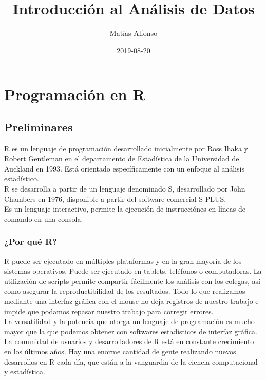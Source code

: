 \documentclass[spanish,]{book}
\title{Introducción al Análisis de Datos}
\author{Matías Alfonso}
\date{2019-08-20}
\begin{document}
\maketitle

{
\setcounter{tocdepth}{1}
\tableofcontents
}
\part{Programación en R}\label{part-programacion-en-r}

\chapter{Preliminares}\label{prelim}

R es un lenguaje de programación desarrollado inicialmente por Ross
Ihaka y Robert Gentleman en el departamento de Estadística de la
Universidad de Auckland en 1993. Está orientado específicamente con un
enfoque al análisis estadístico.\\
R se desarrolla a partir de un lenguaje denominado S, desarrollado por
John Chambers en 1976, disponible a partir del software comercial
S-PLUS.\\
Es un lenguaje interactivo, permite la ejecución de instrucciónes en
líneas de comando en una consola.

\section{¿Por qué R?}\label{por-que-r}

R puede ser ejecutado en múltiples plataformas y en la gran mayoría de
los sistemas operativos. Puede ser ejecutado en tablets, teléfonos o
computadoras. La utilización de scripts permite compartir fácilmente los
análisis con los colegas, así como asegurar la reproductibilidad de los
resultados. Todo lo que realizamos mediante una interfaz gráfica con el
mouse no deja registros de nuestro trabajo e impide que podamos repasar
nuestro trabajo para corregir errores.\\
La versatilidad y la potencia que otorga un lenguaje de programación es
mucho mayor que la que podemos obtener con softwares estadísticos de
interfaz gráfica.\\
La comunidad de usuarios y desarrolladores de R está en constante
crecimiento en los últimos años. Hay una enorme cantidad de gente
realizando nuevos desarrollos en R cada día, que están a la vanguardia
de la ciencia computacional y estadística.
\end{document}

